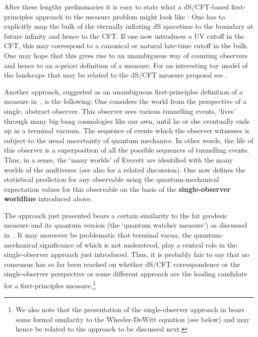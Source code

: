\documentclass[12pt]{article}
\numberwithin{equation}{section}
\begin{document}
After these lengthy preliminaries it is easy to state what a dS/CFT-based first-principles approach to the measure problem might look like \cite{Garriga:2008ks}: One has to explicitly map the bulk of the eternally inflating dS spacetime to the boundary at future infinity and hence to the CFT. If one now introduces a UV cutoff in the CFT, this may correspond to a canonical or natural late-time cutoff in the bulk. One may hope that this gives rise to an unambiguous way of counting observers and hence to an a-priori definition of a measure. For an interesting toy model of the landscape that may be related to the dS/CFT measure proposal see \cite{Harlow:2011az}.
 
Another approach, suggested as an unambiguous first-principles definition of a measure in~\cite{Nomura:2011dt}, is the following: One considers the world from the perspective of a single, abstract observer. This observer sees various tunnelling events, `lives' through many big-bang cosmologies like our own, until he or she eventually ends up in a terminal vacuum. The sequence of events which the observer witnesses is subject to the usual uncertainty of quantum mechanics. In other words, the life of this observer is a superposition of all the possible sequences of tunnelling events. Thus, in a sense, the `many worlds' of Everett are identified with the many worlds of the multiverse (see also \cite{Bousso:2011up} for a related discussion). One now defines the statistical prediction for any observable using the quantum-mechanical expectation values for this observable on the basis of the {\bf single-observer worldline} introduced above.

The approach just presented bears a certain similarity to the fat geodesic measure \cite{Bousso:2008hz} and its quantum version (the `quantum watcher measure') as discussed in~\cite{Vilenkin:2013loa}. It may moreover be problematic that terminal vacua, the quantum-mechanical significance of which is not understood, play a central role in the single-observer approach just introduced. Thus, it is probably fair to say that no consensus has so far been reached on whether dS/CFT correspondence or the single-observer perspective or some different approach are the leading candidate for a first-principles measure.\footnote{
We also note that the presentation of the single-observer approach in \cite{Nomura:2012zb} bears some formal similarity to the Wheeler-DeWitt equation (see below) and may hence be related to the approach to be discussed next.}
\end{document}
